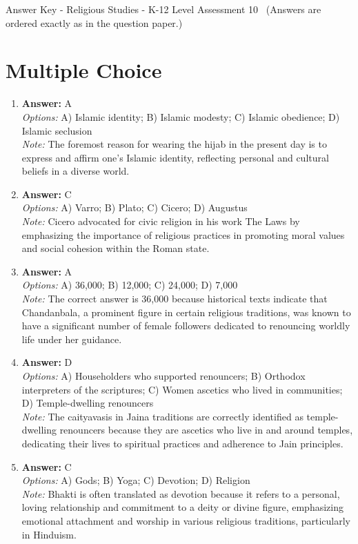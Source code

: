 \documentclass[12pt]{article}
\begin{document}
\begin{center}
Answer Key - Religious Studies - K-12 Level Assessment 10 \
\small (Answers are ordered exactly as in the question paper.)
\end{center}

\section*{Multiple Choice}
\begin{enumerate}[label=\arabic*.]
\item \textbf{Answer:} A
\\ \textit{Options:} A) Islamic identity; B) Islamic modesty; C) Islamic obedience; D) Islamic seclusion
\\ \textit{Note:} The foremost reason for wearing the hijab in the present day is to express and affirm one's Islamic identity, reflecting personal and cultural beliefs in a diverse world.
\item \textbf{Answer:} C
\\ \textit{Options:} A) Varro; B) Plato; C) Cicero; D) Augustus
\\ \textit{Note:} Cicero advocated for civic religion in his work The Laws by emphasizing the importance of religious practices in promoting moral values and social cohesion within the Roman state.
\item \textbf{Answer:} A
\\ \textit{Options:} A) 36,000; B) 12,000; C) 24,000; D) 7,000
\\ \textit{Note:} The correct answer is 36,000 because historical texts indicate that Chandanbala, a prominent figure in certain religious traditions, was known to have a significant number of female followers dedicated to renouncing worldly life under her guidance.
\item \textbf{Answer:} D
\\ \textit{Options:} A) Householders who supported renouncers; B) Orthodox interpreters of the scriptures; C) Women ascetics who lived in communities; D) Temple-dwelling renouncers
\\ \textit{Note:} The caityavasis in Jaina traditions are correctly identified as temple-dwelling renouncers because they are ascetics who live in and around temples, dedicating their lives to spiritual practices and adherence to Jain principles.
\item \textbf{Answer:} C
\\ \textit{Options:} A) Gods; B) Yoga; C) Devotion; D) Religion
\\ \textit{Note:} Bhakti is often translated as devotion because it refers to a personal, loving relationship and commitment to a deity or divine figure, emphasizing emotional attachment and worship in various religious traditions, particularly in Hinduism.
\end{enumerate}
\end{document}
